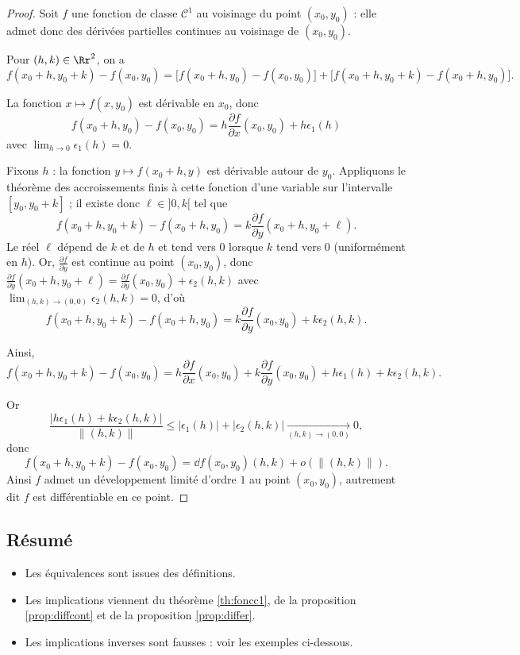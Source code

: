 \documentclass[11pt, class=report,crop=false]{standalone}
\begin{document}
\begin{proof}
Soit $f$ une fonction de classe $\mathcal{C}^1$ au voisinage du point $(x_0,y_0)$ : elle admet donc des dérivées partielles continues au voisinage de $(x_0,y_0)$. 


Pour $(h,k)\in \Rr^2$, on a
$$f(x_0+h,y_0+k)-f(x_0,y_0)=\big[f(x_0+h,y_0)-f(x_0,y_0)\big]
+\big[f(x_0+h,y_0+k)-f(x_0+h,y_0)\big].$$

La fonction $x\mapsto f(x,y_0)$ est dérivable en $x_0$, donc $$f(x_0+h,y_0)-f(x_0,y_0)=h\frac{\partial f}{\partial x}(x_0,y_0)+ h\epsilon_1(h)$$
avec $\lim _{h\to 0}\epsilon _1(h)=0$.

Fixons $h$ : la fonction $y\mapsto f(x_0+h,y)$ est dérivable autour de $y_0$. Appliquons le théorème des accroissements finis à cette fonction d'une variable sur l'intervalle $[y_0,y_0+k]$ ; il existe donc $\ell \in {}]0,k[$ tel que 
$$f(x_0+h,y_0+k)-f(x_0+h,y_0) = k \frac{\partial f}{\partial y}(x_0+h,y_0+\ell).$$
Le réel $\ell$ dépend de $k$ et de $h$ et tend vers $0$ lorsque $k$ tend vers $0$ (uniformément en $h$).
Or, $\frac{\partial f}{\partial y}$ est continue au point $(x_0,y_0)$, donc $\frac{\partial f}{\partial y}(x_0+h,y_0+\ell)=\frac{\partial f}{\partial y}(x_0,y_0)+\epsilon_2(h,k)$ avec $\lim _{(h,k)\to (0,0)}\epsilon_2(h,k)=0$,
d'où
$$f(x_0+h,y_0+k)-f(x_0+h,y_0)=k\frac{\partial f}{\partial y}(x_0,y_0)+k\epsilon _2(h,k).$$

Ainsi, 
$$f(x_0+h,y_0+k)-f(x_0,y_0)=h\frac{\partial f}{\partial x}(x_0,y_0)+k\frac{\partial f}{\partial y}(x_0,y_0)+h\epsilon _1(h)+k\epsilon _2(h,k).$$

Or
$$\frac{|h\epsilon _1(h)+k\epsilon _2(h,k)|}{\|(h,k)\|}\le |\epsilon _1(h)|+|\epsilon _2(h,k)| \xrightarrow[(h,k)\to(0,0)]{} 0,$$
donc
$$f(x_0+h,y_0+k)-f(x_0,y_0)=\dd f (x_0,y_0)(h,k)+o\left(\|(h,k)\|\right).$$
Ainsi $f$ admet un développement limité d'ordre $1$ au point $(x_0,y_0)$, autrement dit $f$ est différentiable en ce point.
\end{proof}



\subsection{Résumé}
 


\begin{itemize}
  \item Les équivalences sont issues des définitions.
  \item Les implications viennent du théorème \ref{th:foncc1}, de la proposition \ref{prop:diffcont} et de la proposition \ref{prop:differ}.
  \item Les implications inverses sont fausses : voir les exemples ci-dessous.
\end{itemize}
    
\end{document}
